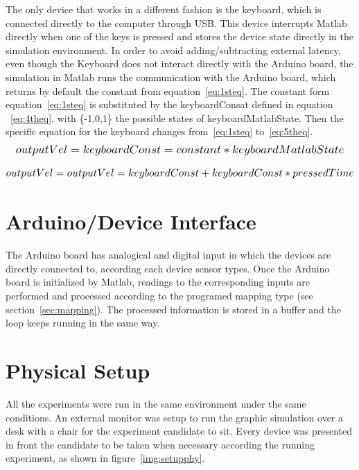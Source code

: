 The only device that works in a different fashion is the keyboard, which is connected directly to the computer through USB. This device interrupts Matlab directly when one of the keys is pressed and stores the device state directly in the simulation environment. In order to avoid adding/subtracting external latency, even though the Keyboard does not interact directly with the Arduino board, the simulation in Matlab runs the communication with the Arduino board, which returns by default the constant from equation~\ref{eq:1steq}. The constant form equation~\ref{eq:1steq} is substituted by the keyboardConsat defined in equation ~\ref{eq:4theq}, with \{-1,0,1\} the possible states of keyboardMatlabState. Then the specific equation for the keyboard changes from~\ref{eq:1steq} to~\ref{eq:5theq}.\\

\begin{equation}
   \scalebox{1.2}{$outputVel=keyboardConst=constant*keyboardMatlabState$}
   \centering
   \label{eq:4theq}
\end{equation}

\begin{equation}
   \scalebox{1.2}{$outputVel=outputVel=keyboardConst+keyboardConst*pressedTime$}
   \centering
   \label{eq:5theq}
\end{equation}


\section{Arduino/Device Interface}\label{sec:arddevinter}
The Arduino board has analogical and digital input in which the devices are directly connected to, according each device sensor types. Once the Arduino board is initialized by Matlab, readings to the corresponding inputs are performed and processed according to the programed mapping type (see section~\ref{sec:mapping}). The processed information is stored in a buffer and the loop keeps running in the same way.\\

\section{Physical Setup}\label{sec:physical}
All the experiments were run in the same environment under the same conditions. An external monitor was setup to run the graphic simulation over a desk with a chair for the experiment candidate to sit. Every device was presented in front the candidate to be taken when necessary according the running experiment, as shown in figure~\ref{img:setupphy}.\\

